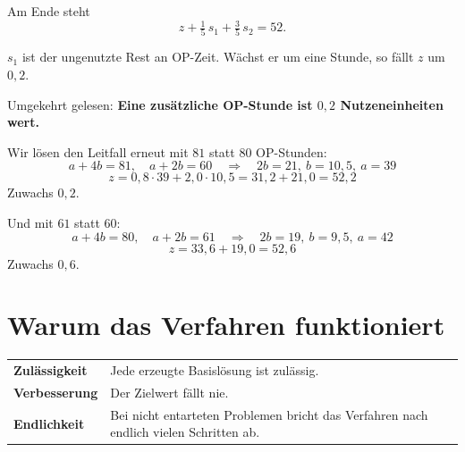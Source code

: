 \begin{merksatz}
Am Ende steht
\[ z + \tfrac15\,s_1 + \tfrac35\,s_2 = 52 . \]

$s_1$ ist der ungenutzte Rest an OP-Zeit. Wächst er um eine Stunde, so fällt $z$ um $0{,}2$.

Umgekehrt gelesen: \textbf{Eine zusätzliche OP-Stunde ist $0{,}2$ Nutzeneinheiten wert.}

Wir lösen den Leitfall erneut mit $81$ statt $80$ OP-Stunden:
\[ a + 4b = 81, \quad a + 2b = 60 \quad\Longrightarrow\quad 2b = 21,\ b = 10{,}5,\ a = 39 \]
\[ z = 0{,}8\cdot39 + 2{,}0\cdot10{,}5 = 31{,}2 + 21{,}0 = 52{,}2 \]
Zuwachs $0{,}2$. \checkmark

Und mit $61$ statt $60$:
\[ a+4b = 80, \quad a+2b = 61 \quad\Longrightarrow\quad 2b = 19,\ b = 9{,}5,\ a = 42 \]
\[ z = 33{,}6 + 19{,}0 = 52{,}6 \]
Zuwachs $0{,}6$. \checkmark

\begin{center}
\begin{minipage}{0.88\textwidth}
\end{minipage}
\end{center}
\end{merksatz}

\section{Warum das Verfahren funktioniert}

\begin{merksatz}
\begin{center}
{\small
\renewcommand{\arraystretch}{1.55}
\begin{tabular}{@{}P{2.4cm}P{6.2cm}@{}}
\toprule
\textbf{Zulässigkeit} & Jede erzeugte Basislösung ist zulässig.\\
\textbf{Verbesserung} & Der Zielwert fällt nie.\\
\textbf{Endlichkeit} & Bei nicht entarteten Problemen bricht das Verfahren nach endlich vielen Schritten ab.\\
\bottomrule
\end{tabular}}
\end{center}
\end{merksatz}

